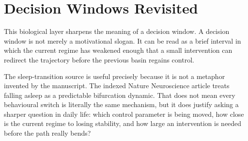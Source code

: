 \section{Decision Windows Revisited}

This biological layer sharpens the meaning of a decision window. A decision
window is not merely a motivational slogan. It can be read as a brief interval
in which the current regime has weakened enough that a small intervention can
redirect the trajectory before the previous basin regains control.

\begin{example}
The sleep-transition source is useful precisely because it is not a metaphor
invented by the manuscript. The indexed Nature Neuroscience article treats
falling asleep as a predictable bifurcation dynamic. That does not mean every
behavioural switch is literally the same mechanism, but it does justify asking
a sharper question in daily life: which control parameter is being moved, how
close is the current regime to losing stability, and how large an intervention
is needed before the path really bends?
\end{example}
